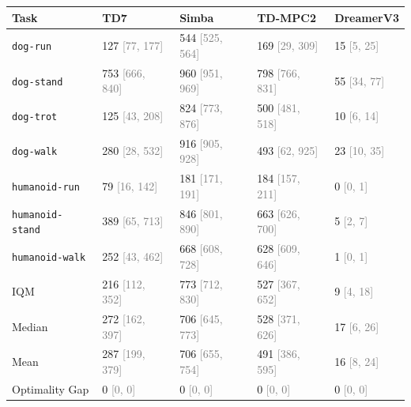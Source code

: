 \begin{tabular}{lllll}
\toprule
Task & TD7 & Simba & TD-MPC2 & DreamerV3 \\
\midrule
\texttt{dog-run} & 127 \textcolor{gray}{[77, 177]} & 544 \textcolor{gray}{[525, 564]} & 169 \textcolor{gray}{[29, 309]} & 15 \textcolor{gray}{[5, 25]} \\
\texttt{dog-stand} & 753 \textcolor{gray}{[666, 840]} & 960 \textcolor{gray}{[951, 969]} & 798 \textcolor{gray}{[766, 831]} & 55 \textcolor{gray}{[34, 77]} \\
\texttt{dog-trot} & 125 \textcolor{gray}{[43, 208]} & 824 \textcolor{gray}{[773, 876]} & 500 \textcolor{gray}{[481, 518]} & 10 \textcolor{gray}{[6, 14]} \\
\texttt{dog-walk} & 280 \textcolor{gray}{[28, 532]} & 916 \textcolor{gray}{[905, 928]} & 493 \textcolor{gray}{[62, 925]} & 23 \textcolor{gray}{[10, 35]} \\
\texttt{humanoid-run} & 79 \textcolor{gray}{[16, 142]} & 181 \textcolor{gray}{[171, 191]} & 184 \textcolor{gray}{[157, 211]} & 0 \textcolor{gray}{[0, 1]} \\
\texttt{humanoid-stand} & 389 \textcolor{gray}{[65, 713]} & 846 \textcolor{gray}{[801, 890]} & 663 \textcolor{gray}{[626, 700]} & 5 \textcolor{gray}{[2, 7]} \\
\texttt{humanoid-walk} & 252 \textcolor{gray}{[43, 462]} & 668 \textcolor{gray}{[608, 728]} & 628 \textcolor{gray}{[609, 646]} & 1 \textcolor{gray}{[0, 1]} \\
IQM & 216 \textcolor{gray}{[112, 352]} & 773 \textcolor{gray}{[712, 830]} & 527 \textcolor{gray}{[367, 652]} & 9 \textcolor{gray}{[4, 18]} \\
Median & 272 \textcolor{gray}{[162, 397]} & 706 \textcolor{gray}{[645, 773]} & 528 \textcolor{gray}{[371, 626]} & 17 \textcolor{gray}{[6, 26]} \\
Mean & 287 \textcolor{gray}{[199, 379]} & 706 \textcolor{gray}{[655, 754]} & 491 \textcolor{gray}{[386, 595]} & 16 \textcolor{gray}{[8, 24]} \\
Optimality Gap & 0 \textcolor{gray}{[0, 0]} & 0 \textcolor{gray}{[0, 0]} & 0 \textcolor{gray}{[0, 0]} & 0 \textcolor{gray}{[0, 0]} \\
\bottomrule
\end{tabular}
